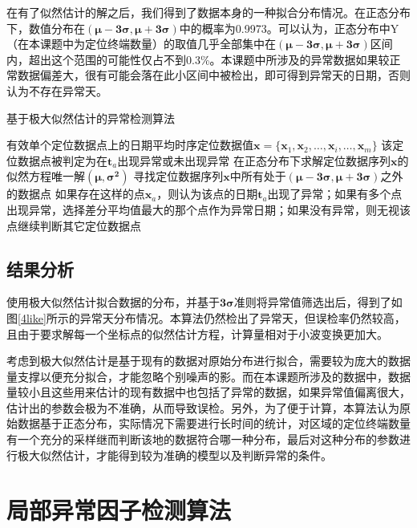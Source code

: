 \documentclass[a4paper,AutoFakeBold,oneside,12pt]{book}
\begin{document}
	在有了似然估计的解之后，我们得到了数据本身的一种拟合分布情况。在正态分布下，数值分布在$\bm{(\mu-3\sigma,\mu+3\sigma)}$中的概率为0.9973。可以认为，正态分布中Y（在本课题中为定位终端数量）的取值几乎全部集中在$\bm{(\mu-3\sigma,\mu+3\sigma)}$区间内，超出这个范围的可能性仅占不到0.3\%。本课题中所涉及的异常数据如果较正常数据偏差大，很有可能会落在此小区间中被检出，即可得到异常天的日期，否则认为不存在异常天。

\begin{algorithm} 
\caption{基于极大似然估计的异常检测算法} 
\label{a44}
\renewcommand{\algorithmicrequire}{\textbf{输入：}}
\renewcommand{\algorithmicensure}{\textbf{输出：}} 
\begin{algorithmic}[1] 
\Require 有效单个定位数据点上的日期平均时序定位数据值$\bm{x}=\{\bm{x}_1,\bm{x}_2,\ldots,\bm{x}_i,\ldots,\bm{x}_m\}$
\Ensure 该定位数据点被判定为在$\bm{t}_a$出现异常或未出现异常
\State  在正态分布下求解定位数据序列$\bm{x}$的似然方程唯一解$\bm{(\mu,\sigma^2)}$
\State  寻找定位数据序列$\bm{x}$中所有处于$\bm{(\mu-3\sigma,\mu+3\sigma)}$之外的数据点
\State 如果存在这样的点$\bm{x}_a$，则认为该点的日期$\bm{t}_a$出现了异常；如果有多个点出现异常，选择差分平均值最大的那个点作为异常日期；如果没有异常，则无视该点继续判断其它定位数据点
\end{algorithmic}  
\end{algorithm}

\subsection{结果分析}
	使用极大似然估计拟合数据的分布，并基于$\bm{3\sigma}$准则将异常值筛选出后，得到了如图\ref{4like}所示的异常天分布情况。本算法仍然检出了异常天，但误检率仍然较高，且由于要求解每一个坐标点的似然估计方程，计算量相对于小波变换更加大。


	考虑到极大似然估计是基于现有的数据对原始分布进行拟合，需要较为庞大的数据量支撑以便充分拟合，才能忽略个别噪声的影。而在本课题所涉及的数据中，数据量较小且这些用来估计的现有数据中也包括了异常的数据，如果异常值偏离很大，估计出的参数会极为不准确，从而导致误检。另外，为了便于计算，本算法认为原始数据基于正态分布，实际情况下需要进行长时间的统计，对区域的定位终端数量有一个充分的采样继而判断该地的数据符合哪一种分布，最后对这种分布的参数进行极大似然估计，才能得到较为准确的模型以及判断异常的条件。

\section{局部异常因子检测算法}
\end{document}
